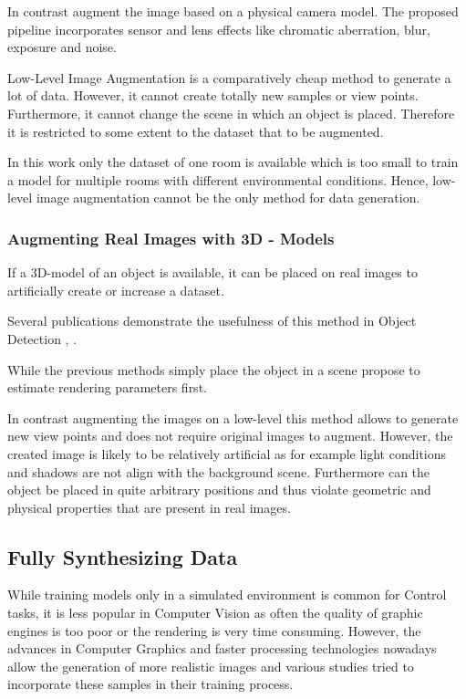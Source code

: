 In contrast \citeauthor{Carlson2018}\cite{Carlson2018} augment the image based on a physical camera model. The proposed pipeline incorporates sensor and lens effects like chromatic aberration, blur, exposure and noise.

Low-Level Image Augmentation is a comparatively cheap method to generate a lot of data. However, it cannot create totally new samples or view points. Furthermore, it cannot change the scene in which an object is placed. Therefore it is restricted to some extent to the dataset that to be augmented.

In this work only the dataset of one room is available which is too small to train a model for multiple rooms with different environmental conditions. Hence, low-level image augmentation cannot be the only method for data generation.

\subsubsection{Augmenting Real Images with 3D - Models}

If a 3D-model of an object is available, it can be placed on real images to artificially create or increase a dataset. 

Several publications demonstrate the usefulness of this method in Object Detection \cite{Girshick2013}, \cite{Peng}.

While the previous methods simply place the object in a scene \citeauthor{Rozantsev} \cite{Rozantsev} propose to estimate rendering parameters first.

In contrast augmenting the images on a low-level this method allows to generate new view points and does not require original images to augment. However, the created image is likely to be relatively artificial as for example light conditions and shadows are not align with the background scene. Furthermore can the object be placed in quite arbitrary positions and thus violate geometric and physical properties that are present in real images. 


\subsection{Fully Synthesizing Data}

\cite{Sadeghi2016,Hinterstoisser2017,Krizhevsky2012a}

While training models only in a simulated environment is common for Control tasks, it is less popular in Computer Vision as often the quality of graphic engines is too poor or the rendering is very time consuming. However, the advances in Computer Graphics and faster processing technologies nowadays allow the generation of more realistic images and various studies tried to incorporate these samples in their training process.

